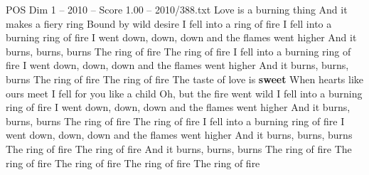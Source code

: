\begin{textsample}{POS Dim 1 – 2010 – Score 1.00 – 2010/388.txt}  \label{ex:f1_pos_027}
Love is a burning thing And it makes a fiery ring Bound by wild desire I fell into a ring of fire I fell into a burning ring of fire I went down, down, down and the flames went higher And it burns, burns, burns The ring of fire The ring of fire I fell into a burning ring of fire I went down, down, down and the flames went higher And it burns, burns, burns The ring of fire The ring of fire The taste of love is \textbf{sweet} When hearts like ours meet I fell for you like a child Oh, but the fire went wild I fell into a burning ring of fire I went down, down, down and the flames went higher And it burns, burns, burns The ring of fire The ring of fire I fell into a burning ring of fire I went down, down, down and the flames went higher And it burns, burns, burns The ring of fire The ring of fire And it burns, burns, burns The ring of fire The ring of fire The ring of fire The ring of fire The ring of fire

\end{textsample}
